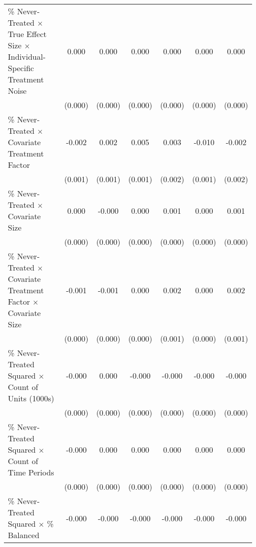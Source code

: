 \begin{table}[htbp]
\begin{tabular}{l*{6}{c}}
\% Never-Treated $\times$ True Effect Size $\times$ Individual-Specific Treatment Noise&       0.000         &       0.000\sym{**} &       0.000         &       0.000         &       0.000         &       0.000         \\
                    &     (0.000)         &     (0.000)         &     (0.000)         &     (0.000)         &     (0.000)         &     (0.000)         \\
\% Never-Treated $\times$ Covariate Treatment Factor&      -0.002\sym{***}&       0.002\sym{*}  &       0.005\sym{***}&       0.003         &      -0.010\sym{***}&      -0.002         \\
                    &     (0.001)         &     (0.001)         &     (0.001)         &     (0.002)         &     (0.001)         &     (0.002)         \\
\% Never-Treated $\times$ Covariate Size&       0.000         &      -0.000         &       0.000         &       0.001\sym{*}  &       0.000         &       0.001\sym{*}  \\
                    &     (0.000)         &     (0.000)         &     (0.000)         &     (0.000)         &     (0.000)         &     (0.000)         \\
\% Never-Treated $\times$ Covariate Treatment Factor $\times$ Covariate Size&      -0.001\sym{***}&      -0.001\sym{**} &       0.000         &       0.002\sym{*}  &       0.000         &       0.002\sym{***}\\
                    &     (0.000)         &     (0.000)         &     (0.000)         &     (0.001)         &     (0.000)         &     (0.001)         \\
\% Never-Treated Squared $\times$ Count of Units (1000s)&      -0.000         &       0.000         &      -0.000         &      -0.000         &      -0.000         &      -0.000         \\
                    &     (0.000)         &     (0.000)         &     (0.000)         &     (0.000)         &     (0.000)         &     (0.000)         \\
\% Never-Treated Squared $\times$ Count of Time Periods&      -0.000         &       0.000         &       0.000\sym{***}&       0.000\sym{***}&       0.000\sym{***}&       0.000\sym{***}\\
                    &     (0.000)         &     (0.000)         &     (0.000)         &     (0.000)         &     (0.000)         &     (0.000)         \\
\% Never-Treated Squared $\times$ \% Balanced&      -0.000\sym{***}&      -0.000\sym{***}&      -0.000\sym{***}&      -0.000\sym{***}&      -0.000\sym{***}&      -0.000\sym{***}\\

\end{tabular}
\end{table}
